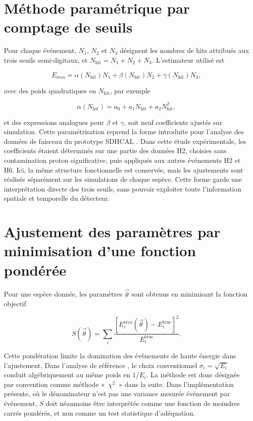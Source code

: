 \section{Méthode paramétrique par comptage de seuils}
\label{subsec:parametric_chi2}

Pour chaque événement, $N_1$, $N_2$ et $N_3$ désignent les nombres de hits attribués aux trois seuils semi-digitaux, et $N_{\mathrm{hit}}=N_1+N_2+N_3$. L'estimateur utilisé est

\begin{equation}
E_{\mathrm{reco}}=
\alpha(N_{\mathrm{hit}})N_1+
\beta(N_{\mathrm{hit}})N_2+
\gamma(N_{\mathrm{hit}})N_3,
\label{eq:energy-parametric}
\end{equation}

avec des poids quadratiques en $N_{\mathrm{hit}}$, par exemple

\begin{equation}
\alpha(N_{\mathrm{hit}})=a_0+a_1N_{\mathrm{hit}}+a_2N_{\mathrm{hit}}^2,
\end{equation}

et des expressions analogues pour $\beta$ et $\gamma$, soit neuf coefficients ajustés sur simulation. Cette paramétrisation reprend la forme introduite pour l'analyse des données de faisceau du prototype SDHCAL \cite{calice2016sdhcal}. Dans cette étude expérimentale, les coefficients étaient déterminés sur une partie des données H2, choisies sans contamination proton significative, puis appliqués aux autres événements H2 et H6. Ici, la même structure fonctionnelle est conservée, mais les ajustements sont réalisés séparément sur les simulations de chaque espèce. Cette forme garde une interprétation directe des trois seuils, sans pouvoir exploiter toute l'information spatiale et temporelle du détecteur.

\section{Ajustement des paramètres par minimisation d'une fonction pondérée}
\label{sec:energie-chi2}

Pour une espèce donnée, les paramètres $\vec{\theta}$ sont obtenus en minimisant la fonction objectif

\begin{equation}
S(\vec{\theta})=
\sum_i
\frac{\left[E_i^{\mathrm{reco}}(\vec{\theta})-E_i^{\mathrm{true}}\right]^2}
{E_i^{\mathrm{true}}}.
\end{equation}

Cette pondération limite la domination des événements de haute énergie dans l'ajustement. Dans l'analyse de référence \cite{calice2016sdhcal}, le choix conventionnel $\sigma_i=\sqrt{E_i}$ conduit algébriquement au même poids en $1/E_i$. La méthode est donc désignée par convention comme méthode «~$\chi^2$~» dans la suite. Dans l'implémentation présente, où le dénominateur n'est pas une variance mesurée événement par événement, $S$ doit néanmoins être interprétée comme une fonction de moindres carrés pondérés, et non comme un test statistique d'adéquation.


